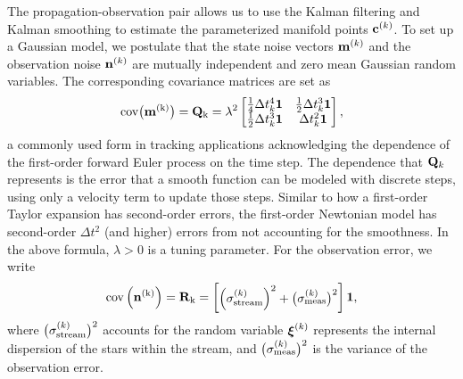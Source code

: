 \documentclass[fleqn,usenatbib]{mnras}
\begin{document}
    The propagation-observation pair allows us to use the Kalman filtering and
    Kalman smoothing to estimate the parameterized manifold points
    $\mathbf{c}^{(k)}$. To set up a Gaussian model, we postulate that the state
    noise vectors $\mathbf{m}^{(k)}$ and the observation noise $\mathbf{n}^{(k)}$ are
    mutually independent and zero mean Gaussian random variables. The
    corresponding covariance matrices are set as
    \begin{equation}
        \rm{cov}\big(\mathbf{m}^{(k)}\big)
        = \mathbf{Q}_k
        = \lambda^2
            \begin{bmatrix}
                \frac{1}{4}\Delta t_k^4 \bf{1} &  \frac{1}{2}\Delta t_k^3 \bf{1} \\
                \frac{1}{2}\Delta t_k^3 \bf{1} & \Delta t_k^2\bf{1}
            \end{bmatrix},
    \end{equation}
    a commonly used form in tracking applications acknowledging the dependence
    of the first-order forward Euler process on the time step. The dependence
    that $\mathbf{Q}_k$ represents is the error that a smooth function can be
    modeled with discrete steps, using only a velocity term to update those
    steps. Similar to how a first-order Taylor expansion has second-order
    errors, the first-order Newtonian model has second-order $\Delta{t}^2$ (and
    higher) errors from not accounting for the smoothness. In the above formula,
    $\lambda>0$ is a tuning parameter. For the observation error, we write
    \begin{equation}
        \rm{cov}\left(\mathbf{n}^{(k)}\right)
        = \mathbf{R}_k
        = \begin{bmatrix} \left(\sigma^{(k)}_{\rm stream}\right)^2 + \big( \sigma^{(k)}_{\rm meas}\big)^2 \end{bmatrix} \bf{1},
    \end{equation}
    where $\big(\sigma^{(k)}_{\rm stream}\big)^2$ accounts for the random
    variable $\mbox{\boldmath$\xi$}^{(k)}$ represents the internal dispersion of the
    stars within the stream, and $\big( \sigma^{(k)}_{\rm meas}\big)^2$ is the
    variance of the observation error.
    
\end{document}
